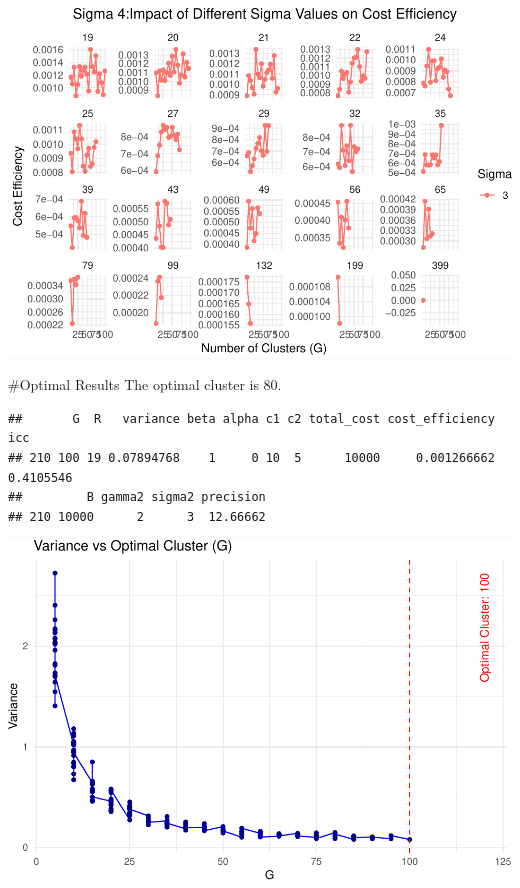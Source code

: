 \documentclass[
]{article}
\begin{document}
\begin{center}\includegraphics{Project3Simulation_files/figure-latex/unnamed-chunk-12-2} \end{center}

\#Optimal Results The optimal cluster is 80.

\begin{verbatim}
##       G  R   variance beta alpha c1 c2 total_cost cost_efficiency       icc
## 210 100 19 0.07894768    1     0 10  5      10000     0.001266662 0.4105546
##         B gamma2 sigma2 precision
## 210 10000      2      3  12.66662
\end{verbatim}

\begin{center}\includegraphics{Project3Simulation_files/figure-latex/unnamed-chunk-13-1} \end{center}
\end{document}
